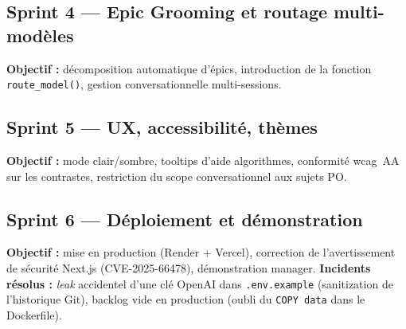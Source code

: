 \subsection*{Sprint 4 --- Epic Grooming et routage multi-modèles}
\textbf{Objectif :} décomposition automatique d'épics, introduction
de la fonction \texttt{route\_model()}, gestion conversationnelle
multi-sessions.

\subsection*{Sprint 5 --- UX, accessibilité, thèmes}
\textbf{Objectif :} mode clair/sombre, tooltips d'aide algorithmes,
conformité \gls{wcag}~AA sur les contrastes, restriction du scope
conversationnel aux sujets PO.

\subsection*{Sprint 6 --- Déploiement et démonstration}
\textbf{Objectif :} mise en production (Render + Vercel), correction
de l'avertissement de sécurité Next.js (CVE-2025-66478), démonstration
manager. \textbf{Incidents résolus :} \emph{leak} accidentel d'une
clé OpenAI dans \texttt{.env.example} (sanitization de l'historique
Git), backlog vide en production (oubli du \texttt{COPY data} dans
le Dockerfile).
